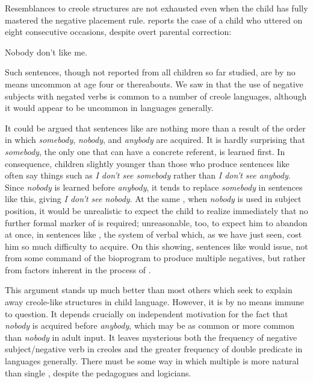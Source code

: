Resemblances to creole structures are not exhausted even when the child has fully mastered the negative placement rule. \citet{McNeill1966} reports the case of a child who uttered  on eight consecutive occasions, despite overt parental correction:

\ea\label{ex:3:63}
Nobody don't like me. 
\z

\noindent Such sentences, though not reported from all children so far studied, are by no means uncommon at age four or thereabouts. We saw in  that the use of negative subjects with negated verbs is common to a number of creole languages, although it would appear to be uncommon in languages generally.

It could be argued that sentences like  are nothing more than a result of the order in which \textit{somebody}, \textit{nobody}, and \textit{anybody} are acquired. It is hardly surprising that \textit{somebody}, the only one that can have a concrete referent, is learned first. In consequence, children slightly younger than those who produce sentences like  often say things such as \textit{I don't see somebody} rather than \textit{I don't see anybody}. Since \textit{nobody} is learned before \textit{anybody}, it tends to replace \textit{somebody} in sentences like this, giving \textit{I don't see nobody}. At the same , when \textit{nobody} is used in subject position, it would be unrealistic to expect the child to realize immediately that no further formal marker of  is required; unreasonable, too, to expect him to abandon at once, in sentences like , the system of verbal  which, as we have just seen, cost him so much difficulty to acquire. On this showing, sentences like  would issue, not from some command of the bioprogram to produce multiple negatives, but rather from factors inherent in the process of  .

This argument stands up much better than most others which seek to explain away creole-like structures in child language. However, it is by no means immune to question. It depends crucially on independent motivation for the fact that \textit{nobody} is acquired before \textit{anybody}, which may be as common or more common than \textit{nobody} in adult input. It leaves mysterious both the frequency of negative subject/negative verb in creoles and the greater frequency of double predicate  in languages generally. There must be some way in which multiple  is more natural than single , despite the pedagogues and logicians.

